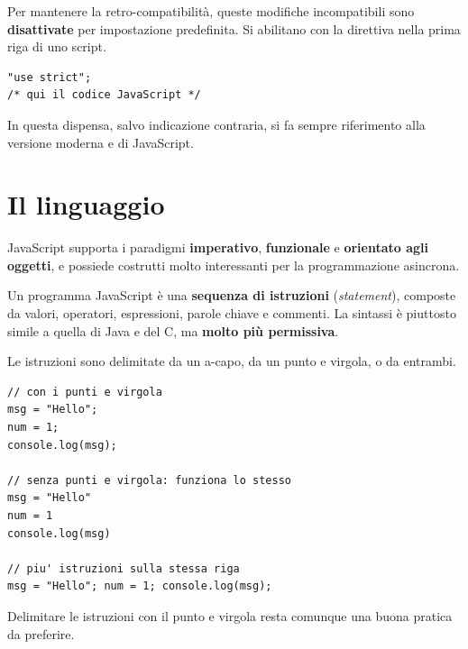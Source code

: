 Per mantenere la retro-compatibilità, queste modifiche incompatibili sono
\textbf{disattivate} per impostazione predefinita. Si abilitano con la direttiva
 nella prima riga di uno script.

\begin{lstlisting}[style=js, name=script.js]
"use strict";
/* qui il codice JavaScript */
\end{lstlisting}

In questa dispensa, salvo indicazione contraria, si fa sempre riferimento alla
versione moderna e  di JavaScript.


\section{Il linguaggio}

JavaScript supporta i paradigmi \textbf{imperativo}, \textbf{funzionale} e
\textbf{orientato agli oggetti}, e possiede costrutti molto interessanti per la
programmazione asincrona.

Un programma JavaScript è una \textbf{sequenza di istruzioni}
(\textit{statement}), composte da valori, operatori, espressioni, parole chiave
e commenti. La sintassi è piuttosto simile a quella di Java e del C, ma
\textbf{molto più permissiva}.

Le istruzioni sono delimitate da un a-capo, da un punto e virgola, o da
entrambi.

\begin{lstlisting}[style=js, name=istruzioni.js]
// con i punti e virgola
msg = "Hello";
num = 1;
console.log(msg);

// senza punti e virgola: funziona lo stesso
msg = "Hello"
num = 1
console.log(msg)

// piu' istruzioni sulla stessa riga
msg = "Hello"; num = 1; console.log(msg);
\end{lstlisting}

Delimitare le istruzioni con il punto e virgola resta comunque una buona
pratica da preferire.

